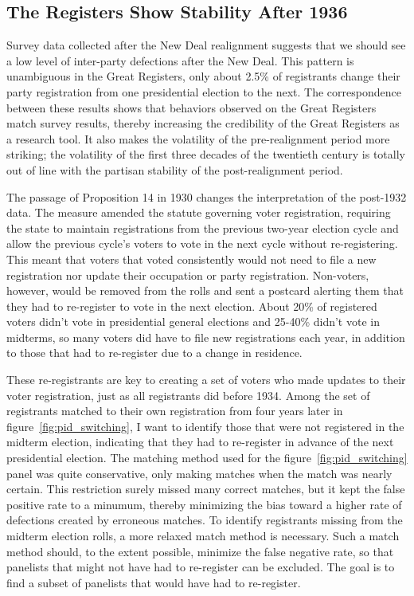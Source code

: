 \documentclass[11pt]{scrartcl}\usepackage[]{graphicx}\usepackage[]{color}
\begin{document}
\subsection*{The Registers Show Stability After 1936}

Survey data collected after the New Deal realignment suggests that we should see a low level of inter-party defections after the New Deal. This pattern is unambiguous in the Great Registers, only about 2.5\% of registrants change their party registration from one presidential election to the next. The correspondence between these results shows that behaviors observed on the Great Registers match survey results, thereby increasing the credibility of the Great Registers as a research tool. It also makes the volatility of the pre-realignment period more striking; the volatility of the first three decades of the twentieth century is totally out of line with the partisan stability of the post-realignment period.

The passage of Proposition 14 in 1930 changes the interpretation of the post-1932 data. The measure amended the statute governing voter registration, requiring the state to maintain registrations from the previous two-year election cycle and allow the previous cycle's voters to vote in the next cycle without re-registering. This meant that voters that voted consistently would not  need to file a new registration nor update their occupation or party registration. Non-voters, however, would be removed from the rolls and sent a postcard alerting them that they had to re-register to vote in the next election. About 20\% of registered voters didn't vote in presidential general elections and 25-40\% didn't vote in midterms, so many voters did have to file new registrations each year, in addition to those that had to re-register due to a change in residence. 

These re-registrants are key to creating a set of voters who made updates to their voter registration, just as all registrants did before 1934. Among the set of registrants matched to their own registration from four years later in figure~\ref{fig:pid_switching}, I want to identify those that were not registered in the midterm election, indicating that they had to re-register in advance of the next presidential election. The matching method used for the figure~\ref{fig:pid_switching} panel was quite conservative, only making matches when the match was nearly certain. This restriction surely missed many correct matches, but it kept the false positive rate to a minumum, thereby minimizing the bias toward a higher rate of defections created by erroneous matches. To identify registrants missing from the midterm election rolls, a more relaxed match method is necessary. Such a match method should, to the extent possible, minimize the false negative rate, so that panelists that might not have had to re-register can be excluded.  The goal is to find a subset of panelists that would have had to re-register.
\end{document}
